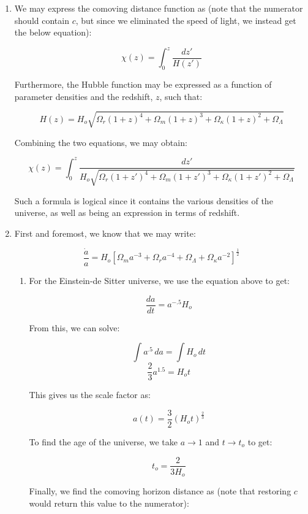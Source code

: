 \begin{enumerate}

  \item

    We may express the comoving distance function as (note that the numerator should contain $c$, but since we eliminated the speed of light, we instead get the below equation):

    $$\chi(z)=\int_0^z \frac{dz'}{H(z')}$$

    Furthermore, the Hubble function may be expressed as a function of parameter densities and the redshift, $z$, such that:

    $$H(z)=H_o\sqrt{\Omega_r(1+z)^4+\Omega_m(1+z)^3+\Omega_{\kappa}(1+z)^2+\Omega_{\Lambda}}$$

    Combining the two equations, we may obtain:

    $$\boxed{\chi(z)=\int_0^z \frac{dz'}{H_o\sqrt{\Omega_r(1+z')^4+\Omega_m(1+z')^3+\Omega_{\kappa}(1+z')^2+\Omega_{\Lambda}}}}$$

    Such a formula is logical since it contains the various densities of the universe, as well as being an expression in terms of redshift.

  \item First and foremost, we know that we may write:

    $$\frac{\dot{a}}{a}=H_o\left[ \Omega_ma^{-3}+\Omega_ra^{-4}+\Omega_{\Lambda}+\Omega_{\kappa}a^{-2} \right]^{\frac{1}{2}}$$

    \begin{enumerate}

      \item For the Einstein-de Sitter universe, we use the equation above to get:

        $$\frac{da}{dt}=a^{-.5}H_o$$

        From this, we can solve:

        $$\int a^{.5}\,da=\int H_o\,dt$$
        $$\frac{2}{3}a^{1.5}=H_ot$$

        This gives us the scale factor as:

        $$\boxed{a(t)=\frac{3}{2}\left( H_ot \right)^{\frac{2}{3}}}$$

        To find the age of the universe, we take $a\to1$ and $t\to t_o$ to get:

        $$\boxed{t_o=\frac{2}{3H_o}}$$

        Finally, we find the comoving horizon distance as (note that restoring $c$ would return this value to the numerator):


\end{enumerate}
\end{enumerate}
